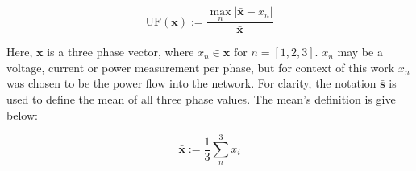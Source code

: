 \begin{equation}
	\text{UF}(\textbf{x}) := \frac{\max_n |\bar{\textbf{x}} - x_n|}{\bar{\textbf{x}}}
	\label{ch1:equ:unbalance-equation}
\end{equation}

Here, $\textbf{x}$ is a three phase vector, where $x_n \in \textbf{x} \text{ for } n=[1, 2, 3]$.
$x_n$ may be a voltage, current or power measurement per phase, but for context of this work $x_n$ was chosen to be the power flow into the network.
For clarity, the notation $\bar{\textbf{s}}$ is used to define the mean of all three phase values.
The mean's definition is give below:

\begin{equation}
	\bar{\textbf{x}} := \frac{1}{3}\sum_n^3{x_i}
\end{equation}
